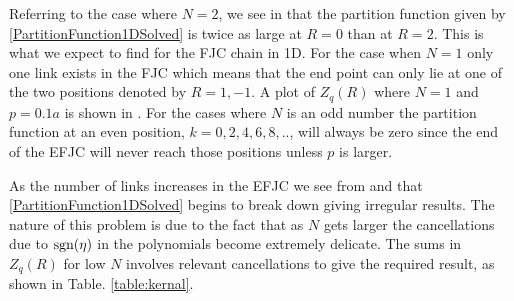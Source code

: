 Referring to the case where $N=2$, we see in  that the partition function given by \eqref{PartitionFunction1DSolved} is twice as large at $R=0$ than at $R=2$. This is what we expect to find for the FJC chain in 1D. For the case when $N=1$ only one link exists in the FJC which means that the end point can only lie at one of the two positions denoted by $R=1,-1$. A plot of $Z_{q}\left(R\right)$ where $N=1$ and $p=0.1a$ is shown in . For the cases where $N$ is an odd number the partition function at an even position, $k=0,2,4,6,8,..$, will always be zero since the end of the EFJC will never reach those positions unless $p$ is larger.

As the number of links increases in the EFJC we see from  and  that \eqref{PartitionFunction1DSolved} begins to break down giving irregular results. The nature of this problem is due to the fact that as $N$ gets larger the cancellations due to $\text{sgn}(\eta)$ in the polynomials become extremely delicate. The sums in $Z_{q}\left(R\right)$ for low $N$ involves relevant cancellations to give the required result, as shown in Table. \ref{table:kernal}.

